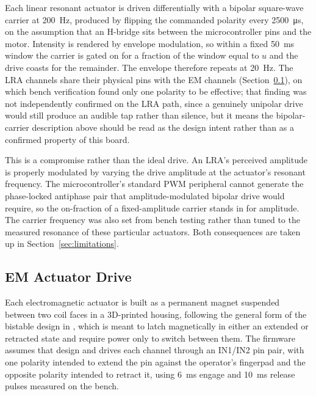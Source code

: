 \documentclass[12pt, a4paper, twoside, openright]{report}
\begin{document}
Each linear resonant actuator is driven differentially with a bipolar
square-wave carrier at \SI{200}{\hertz}, produced by flipping the commanded
polarity every \SI{2500}{\micro\second}, on the assumption that an H-bridge
sits between the microcontroller pins and the motor. Intensity is rendered by
envelope modulation, so within a fixed \SI{50}{\milli\second} window the
carrier is gated on for a fraction of the window equal to $u$ and the drive
coasts for the remainder. The envelope therefore repeats at \SI{20}{\hertz}.
The LRA channels share their physical pins with the EM channels
(Section~\ref{subsec:em-drive}), on which bench verification found only one
polarity to be effective; that finding was not independently confirmed on the
LRA path, since a genuinely unipolar drive would still produce an audible tap
rather than silence, but it means the bipolar-carrier description above should
be read as the design intent rather than as a confirmed property of this
board.

This is a compromise rather than the ideal drive. An LRA's perceived amplitude
is properly modulated by varying the drive amplitude at the actuator's resonant
frequency. The microcontroller's standard PWM peripheral cannot generate the
phase-locked antiphase pair that amplitude-modulated bipolar drive would
require, so the on-fraction of a fixed-amplitude carrier stands in for
amplitude. The carrier frequency was also set from bench testing rather than
tuned to the measured resonance of these particular actuators. Both
consequences are taken up in Section~\ref{sec:limitations}.

\subsection{EM Actuator Drive}
\label{subsec:em-drive}

Each electromagnetic actuator is built as a permanent magnet suspended between
two coil faces in a 3D-printed housing, following the general form of the
bistable design in \cite{vechev2019}, which is meant to latch magnetically in
either an extended or retracted state and require power only to switch between
them. The firmware assumes that design and drives each channel through an
IN1/IN2 pin pair, with one polarity intended to extend the pin against the
operator's fingerpad and the opposite polarity intended to retract it, using
\SI{6}{\milli\second} engage and \SI{10}{\milli\second} release pulses measured
on the bench.
\end{document}
